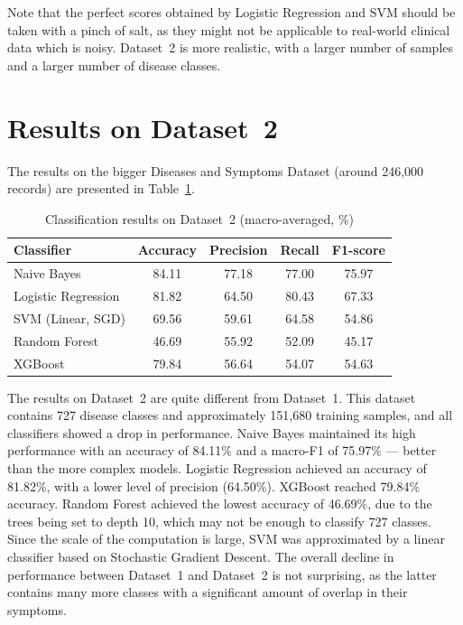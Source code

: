 Note that the perfect scores obtained by Logistic Regression and SVM should be taken with a pinch of salt, as they might not be applicable to real-world clinical data which is noisy. Dataset~2 is more realistic, with a larger number of samples and a larger number of disease classes.

\section{Results on Dataset~2}
\label{sec:results_dataset2}

The results on the bigger Diseases and Symptoms Dataset (around 246,000 records) are presented in Table~\ref{tab:results_dataset2}.

\begin{table}[H]
\centering
\caption{Classification results on Dataset~2 (macro-averaged, \%)}
\label{tab:results_dataset2}
\begin{tabular}{@{}lcccc@{}}
\toprule
\textbf{Classifier} & \textbf{Accuracy} & \textbf{Precision} & \textbf{Recall} & \textbf{F1-score} \\
\midrule
Naive Bayes          & 84.11 & 77.18 & 77.00 & 75.97 \\
Logistic Regression  & 81.82 & 64.50 & 80.43 & 67.33 \\
SVM (Linear, SGD)    & 69.56 & 59.61 & 64.58 & 54.86 \\
Random Forest        & 46.69 & 55.92 & 52.09 & 45.17 \\
XGBoost              & 79.84 & 56.64 & 54.07 & 54.63 \\
\bottomrule
\end{tabular}
\end{table}

The results on Dataset~2 are quite different from Dataset~1. This dataset contains 727 disease classes and approximately 151{,}680 training samples, and all classifiers showed a drop in performance. Naive Bayes maintained its high performance with an accuracy of 84.11\% and a macro-F1 of 75.97\% --- better than the more complex models. Logistic Regression achieved an accuracy of 81.82\%, with a lower level of precision (64.50\%). XGBoost reached 79.84\% accuracy. Random Forest achieved the lowest accuracy of 46.69\%, due to the trees being set to depth 10, which may not be enough to classify 727 classes. Since the scale of the computation is large, SVM was approximated by a linear classifier based on Stochastic Gradient Descent. The overall decline in performance between Dataset~1 and Dataset~2 is not surprising, as the latter contains many more classes with a significant amount of overlap in their symptoms.

